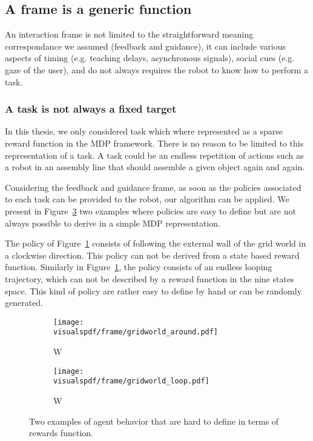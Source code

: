 \subsection{A frame is a generic function}
\label{chapter:limitations:framegeneric}

An interaction frame is not limited to the straightforward meaning correspondance we assumed (feedback and guidance), it can include various aspects of timing (e.g. teaching delays, asynchronous signals), social cues (e.g. gaze of the user), and do not always requires the robot to know how to perform a task.

\subsubsection*{A task is not always a fixed target}

In this thesis, we only considered task which where represented as a sparse reward function in the MDP framework. There is no reason to be limited to this representation of a task. A task could be an endless repetition of actions such as a robot in an assembly line that should assemble a given object again and again.

Considering the feedback and guidance frame, as soon as the policies associated to each task can be provided to the robot, our algorithm can be applied. We present in Figure~\ref{fig:gridwolrdgenericframes} two examples where policies are easy to define but are not always possible to derive in a simple MDP representation.

The policy of Figure~\ref{fig:gridwolrdgenericframesaround} consists of following the external wall of the grid world in a clockwise direction. This policy can not be derived from a state based reward function. Similarly in Figure~\ref{fig:gridwolrdgenericframesaround}, the policy consists of an endless looping trajectory, which can not be described by a reward function in the nine states space. This kind of policy are rather easy to define by hand or can be randomly generated. 

\begin{figure}[!htbp]
\centering
    \begin{subfigure}[b]{0.49\columnwidth}
        \centering
        \texttt{[image: \\visualspdf/frame/gridworld\_around.pdf]}
        \caption{W}
        \label{fig:gridwolrdgenericframesaround}
    \end{subfigure}
    \begin{subfigure}[b]{0.49\columnwidth}
        \centering
        \texttt{[image: \\visualspdf/frame/gridworld\_loop.pdf]}
        \caption{W}
        \label{fig:gridwolrdgenericframesloop}
    \end{subfigure}
\caption{Two examples of agent behavior that are hard to define in terms of rewards function.}
\label{fig:gridwolrdgenericframes}
\end{figure}

